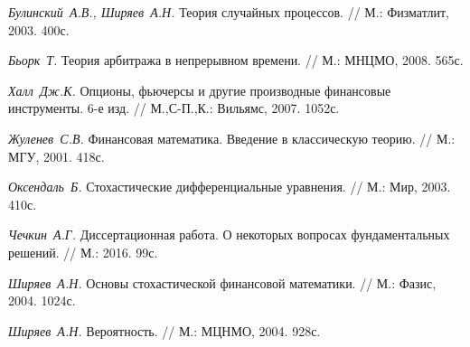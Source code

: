 \documentclass[a4paper, 12pt]{extreport}
\numberwithin{equation}{section}
\begin{document}
	\begin{thebibliography}{99}
	
		
		
		{\it Булинский~А.В., Ширяев~А.Н.} Теория случайных процессов. // М.: Физматлит, 2003. 400с.

		
	
		{\it Бьорк~Т.} Теория арбитража в непрерывном времени. // М.: МНЦМО, 2008. 565с.

	

		{\it Халл~Дж.К.} Опционы, фьючерсы и другие производные финансовые инструменты. 6-е изд. // М.,С-П.,К.: Вильямс, 2007. 1052с.


		{\it Жуленев~С.В.} Финансовая математика. Введение в классическую теорию. // М.: МГУ, 2001. 418с.
	
	
		{\it Оксендаль~Б.} Стохастические дифференциальные уравнения. // М.: Мир, 2003. 410с.

	

		{\it Чечкин~А.Г.} Диссертационная работа. О некоторых вопросах фундаментальных решений. // М.: 2016. 99с.
		
		
		{\it Ширяев~А.Н.} Основы стохастической финансовой математики. // М.: Фазис, 2004. 1024с.
		
		
		{\it Ширяев~А.Н.} Вероятность. // М.: МЦНМО, 2004. 928с.
		
	\end{thebibliography}

	\thispagestyle{empty}
	
	
	
	
	
	

	
\end{document}
